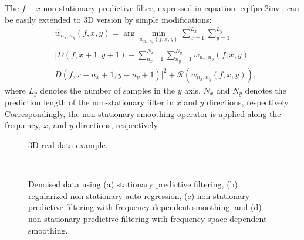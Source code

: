 The $f-x$ non-stationary predictive filter, expressed in equation \ref{eq:fpre2inv}, can be easily extended to 3D version by simple modifications:
\begin{equation}
\label{eq:fpre2inv2}
\begin{split}
&\hat{w}_{n_x,n_y}(f,x,y)=\arg \min_{w_{n_x,n_y}(f,x,y)} \sum_{x=1}^{L_x}\sum_{y=1}^{L_y} \\
&|D(f,x+1,y+1)-\sum_{n_x=1}^{N_x}\sum_{n_y=1}^{N_y}w_{n_x,n_y}(f,x,y)\\
&D(f,x-n_x+1,y-n_y+1)|^2 + \mathcal{R}(w_{n_x,n_y}(f,x,y)),
\end{split}
\end{equation}
where $L_y$ denotes the number of samples in the $y$ axis, $N_x$ and $N_y$ denotes the prediction length of the non-stationary filter in $x$ and $y$ directions, respectively. Correspondingly, the non-stationary smoothing operator is applied along the frequency, $x$, and $y$ directions, respectively. 





\begin{figure}[htb!]
\centering
{}
\caption{3D real data example.}
\label{fig:real}
\end{figure}

\begin{figure*}[ht!]
\centering
{}
\\
\caption{Denoised data using (a) stationary predictive filtering, (b) regularized non-stationary auto-regression, (c) non-stationary predictive filtering with frequency-dependent smoothing, and (d) non-stationary predictive filtering with frequency-space-dependent smoothing.}
\label{fig:rtest2,rtest1,rtest00,rtest3}
\end{figure*}

